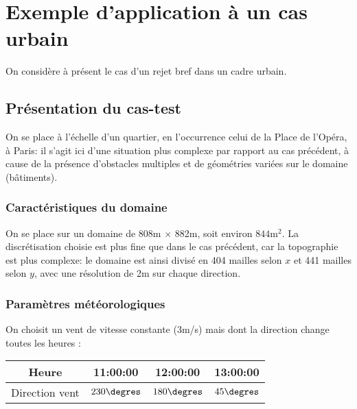 \section{Exemple d'application à un cas urbain}

On considère à présent le cas d'un rejet bref dans un cadre urbain.\\

\subsection{Présentation du cas-test}

On se place à l'échelle d'un quartier, en l'occurrence celui de la Place de l'Opéra, à Paris: il s'agit ici d'une situation plus complexe par rapport au cas précédent, à cause de la présence d'obstacles multiples et de géométries variées sur le domaine (bâtiments). \\


\subsubsection{Caractéristiques du domaine}

On se place sur un domaine de 808m $\times$ 882m, soit environ $844\text{m}^2$. La discrétisation choisie est plus fine que dans le cas précédent, car la topographie est plus complexe: le domaine est ainsi divisé en 404 mailles selon $x$ et 441 mailles selon $y$, avec une résolution de 2m sur chaque direction. \\


\subsubsection{Paramètres météorologiques}

On choisit un vent de vitesse constante (3m/s) mais dont la direction change toutes les heures : \\

\begin{center}
\begin{tabular}{cccc}
	\centering
	Heure & 11:00:00 &  12:00:00 &  13:00:00\\ 
	\hline
	 Direction vent & $230\degres$ & $180\degres$ & $45\degres$
\end{tabular} 
\end{center}

